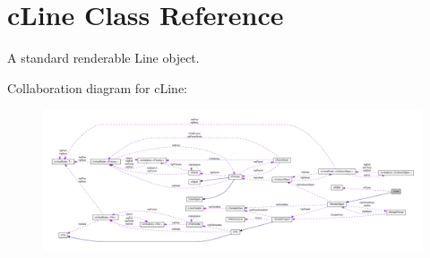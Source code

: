 \hypertarget{classc_line}{
\section{cLine Class Reference}
\label{classc_line}
}


A standard renderable Line object.  




Collaboration diagram for cLine:\nopagebreak
\begin{figure}[H]
\begin{center}
\leavevmode
\includegraphics[width=400pt]{classc_line__coll__graph}
\end{center}
\end{figure}
